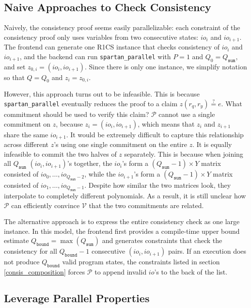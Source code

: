\documentclass{article}
\newcommand{\code}{\texttt}
\newcommand{\Qbound}{Q_{\mathtt{bound}}}
\newcommand{\Qsum}{Q_{\mathtt{sum}}}
\renewcommand{\P}{\mathcal{P}}
\newcommand{\V}{\mathcal{V}}
\newcommand{\eqq}{\stackrel{?}{=}}
\begin{document}
\subsection{Naive Approaches to Check Consistency}

Naively, the consistency proof seems easily parallelizable: each constraint of the consistency proof only uses variables from two consecutive states: $io_i$ and $io_{i + 1}$. The frontend can generate one R1CS instance that checks consistency of $io_i$ and $io_{i + 1}$, and the backend can run \code{spartan\_parallel} with $P = 1$ and $Q_0 = \Qsum$, and set $z_{0, i} = (io_i, io_{i + 1})$. Since there is only one instance, we simplify notation so that $Q = Q_0$ and $z_i = z_{0, i}$.

However, this approach turns out to be infeasible. This is because \code{spartan\_parallel} eventually reduces the proof to a claim $z(r_q, r_y) \eqq e$. What commitment should be used to verify this claim? $\P$ cannot use a single commitment on $z$, because $z_{i} = (io_i, io_{i + 1})$, which means that $z_i$ and $z_{i+1}$ share the same $io_{i + 1}$. It would be extremely difficult to capture this relationship across different $z$'s using one single commitment on the entire $z$. It is equally infeasible to commit the two halves of $z$ separately. This is because when joining all $\Qsum$ $(io_i, io_{i + 1})$'s together, the $io_i$'s form a $(\Qsum - 1)\times Y$ matrix consisted of $io_0, \dots, io_{\Qsum - 2}$, while the $io_{i + 1}$'s form a $(\Qsum - 1)\times Y$ matrix consisted of $io_1, \dots, io_{\Qsum - 1}$. Despite how similar the two matrices look, they interpolate to completely different polynomials. As a result, it is still unclear how $\P$ can efficiently convince $\V$ that the two commitments are related.

The alternative approach is to express the entire consistency check as one large instance. In this model, the frontend first provides a compile-time upper bound estimate $\Qbound = \max(\Qsum)$ and generates constraints that check the consistency for all $\Qbound - 1$ consecutive $(io_i, io_{i + 1})$ pairs. If an execution does not produce $\Qbound$ valid program states, the constraints listed in section \ref{consis_composition} forces $\P$ to append invalid $io$'s to the back of the list.

\subsection{Leverage Parallel Properties}
\end{document}
